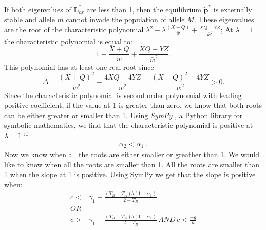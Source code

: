 \documentclass[12pt]{extarticle}
\let\vec\mathbf
\begin{document}
\begin{appendices}
If both eigenvalues of $\mathbf{L}^*_{ex}$ are less than 1, then the equilibrium $\vec{\tilde{p}^*}$ is externally stable and allele $m$ cannot invade the population of allele $M$. 
These eigenvalues are the root of the characteristic polynomial $\lambda^2 -\lambda \frac{(X+Q)}{\bar{w}} + \frac{XQ - YZ}{\bar{w}^2}$; At $\lambda = 1$ the characteristic polynomial is equal to:
\begin{equation} \label{eq:characteristic_at_1}
  1-\frac{X+Q}{\bar{w}} + \frac{XQ-YZ}{\bar{w}^2}.
\end{equation}
This polynomial has at least one real root since 
\begin{equation} \label{eq:delta}
  \Delta = \frac{(X+Q)^2}{\bar{w}^2}-\frac{4XQ-4YZ}{\bar{w}^2}=\frac{(X-Q)^2+4YZ}{\bar{w}^2} > 0.
\end{equation}
Since the characteristic polynomial is second order polynomial with leading positive coefficient, if the value at 1 is greater than zero, we know that both roots can be either greater or smaller than 1.
Using \emph{SymPy} \citep{Meurer2017}, a Python library for symbolic mathematics, we find that the characteristic polynomial is positive at $\lambda = 1$ if 
\begin{equation} \label{eq:both_roots_greater_or_smaller_than_1_condition}
\begin{aligned}
 \alpha_2 < \alpha_1 \;.
\end{aligned}
\end{equation}
Now we know when all the roots are either smaller or greather than 1. We would like to know when all the roots are smaller than 1.
All the roots are smaller than 1 when the slope at 1 is positive. 
Using SymPy we get that the slope is positive when:
\begin{equation} \label{eq:eigenvalues_smaller_than_1_condition}
  \begin{aligned}
   c < &\gamma_1 - \frac{(T_B-T_A)b(1-\alpha_1)}{2-T_B} \\
   OR \\
   c > &\gamma_1 - \frac{(T_B-T_A)b(1-\alpha_1)}{2-T_B} \, AND\, c<\frac{-g}{h}
  \end{aligned}
  \end{equation}
\end{appendices}






\end{document}
